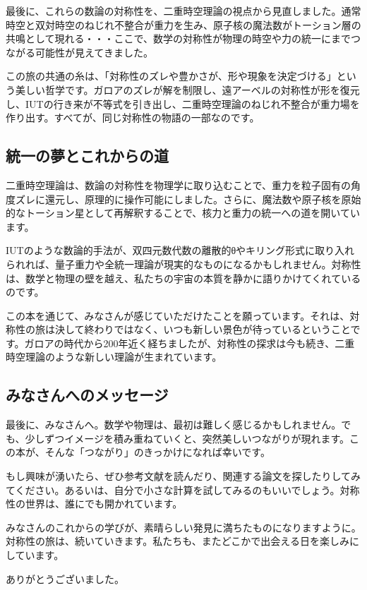 \documentclass[dvipdfmx,12pt,a4paper]{jsarticle}
\begin{document}
最後に、これらの数論の対称性を、二重時空理論の視点から見直しました。通常時空と双対時空のねじれ不整合が重力を生み、原子核の魔法数がトーション層の共鳴として現れる・・・ここで、数学の対称性が物理の時空や力の統一にまでつながる可能性が見えてきました。

この旅の共通の糸は、「対称性のズレや豊かさが、形や現象を決定づける」という美しい哲学です。ガロアのズレが解を制限し、遠アーベルの対称性が形を復元し、IUTの行き来が不等式を引き出し、二重時空理論のねじれ不整合が重力場を作り出す。すべてが、同じ対称性の物語の一部なのです。

\subsection{統一の夢とこれからの道}

二重時空理論は、数論の対称性を物理学に取り込むことで、重力を粒子固有の角度ズレに還元し、原理的に操作可能にしました。さらに、魔法数や原子核を原始的なトーション星として再解釈することで、核力と重力の統一への道を開いています。

IUTのような数論的手法が、双四元数代数の離散的θやキリング形式に取り入れられれば、量子重力や全統一理論が現実的なものになるかもしれません。対称性は、数学と物理の壁を越え、私たちの宇宙の本質を静かに語りかけてくれているのです。

この本を通じて、みなさんが感じていただけたことを願っています。それは、対称性の旅は決して終わりではなく、いつも新しい景色が待っているということです。ガロアの時代から200年近く経ちましたが、対称性の探求は今も続き、二重時空理論のような新しい理論が生まれています。

\subsection{みなさんへのメッセージ}

最後に、みなさんへ。数学や物理は、最初は難しく感じるかもしれません。でも、少しずつイメージを積み重ねていくと、突然美しいつながりが現れます。この本が、そんな「つながり」のきっかけになれば幸いです。

もし興味が湧いたら、ぜひ参考文献を読んだり、関連する論文を探したりしてみてください。あるいは、自分で小さな計算を試してみるのもいいでしょう。対称性の世界は、誰にでも開かれています。

みなさんのこれからの学びが、素晴らしい発見に満ちたものになりますように。対称性の旅は、続いていきます。私たちも、またどこかで出会える日を楽しみにしています。

ありがとうございました。
\end{document}
